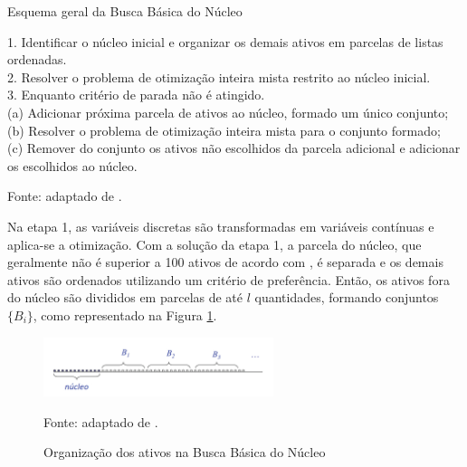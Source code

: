                     \begin{algorithm}
                        \caption{Esquema geral da Busca Básica do Núcleo}
                        \label{alg:BKS}
                        1. Identificar o núcleo inicial e organizar os demais ativos em parcelas de listas ordenadas. \\
                        2. Resolver o problema de otimização inteira mista restrito ao núcleo inicial. \\
                        3. Enquanto critério de parada não é atingido. \\
                            (a) Adicionar próxima parcela de ativos ao núcleo, formado um único conjunto; \\
                            (b) Resolver o problema de otimização inteira mista para o conjunto formado; \\
                            (c) Remover do conjunto os ativos não escolhidos da parcela adicional e adicionar os escolhidos ao núcleo. 
                        \par \footnotesize Fonte: adaptado de . %
                        \end{algorithm}
                
                    \ipar Na etapa 1, as variáveis discretas são transformadas em variáveis contínuas e aplica-se a otimização. Com a solução da etapa 1, a parcela do núcleo, que geralmente não é superior a 100 ativos de acordo com , é separada e os demais ativos são ordenados utilizando um critério de preferência. Então, os ativos fora do núcleo são divididos em parcelas de até $l$ quantidades, formando conjuntos $\{B_i\}$, como representado na Figura \ref{fig:parcelas}. 
                
                    \begin{figure}[H]
                        \centering
                        \caption{Organização dos ativos na Busca Básica do Núcleo}
                        \includegraphics[width=0.6\textwidth]{imagens/parcelas.png}
                        \label{fig:parcelas}
                        \par \footnotesize Fonte: adaptado de . %
                    \end{figure}
                
